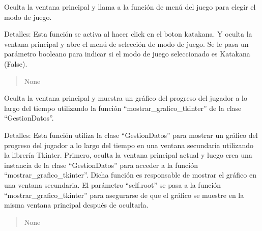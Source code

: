 \documentclass[letterpaper,10pt,spanish]{sphinxmanual}
\begin{document}
\begin{fulllineitems}
\begin{fulllineitems}
\begin{quote}
\begin{description}
\end{description}\end{quote}

\end{fulllineitems}


\begin{fulllineitems}
\label{\detokenize{main:main.MenuPrincipal.decision_katakana}}
\pysigstartsignatures
{}
\pysigstopsignatures
\sphinxAtStartPar
Oculta la ventana principal y llama a la función de menú del juego para elegir el modo de juego.

\sphinxAtStartPar
Detalles:
Esta función se activa al hacer click en el boton katakana. Y oculta la ventana principal y abre el
menú de selección de modo de juego. Se le pasa un parámetro booleano para indicar si el modo de juego
seleccionado es Katakana (False).
\begin{quote}\begin{description}
\sphinxAtStartPar
None

\end{description}\end{quote}

\end{fulllineitems}


\begin{fulllineitems}
\label{\detokenize{main:main.MenuPrincipal.mostrar_registro}}
\pysigstartsignatures
{}
\pysigstopsignatures
\sphinxAtStartPar
Oculta la ventana principal y muestra un gráfico del progreso del jugador a lo largo del tiempo
utilizando la función “mostrar\_grafico\_tkinter” de la clase “GestionDatos”.

\sphinxAtStartPar
Detalles:
Esta función utiliza la clase “GestionDatos” para mostrar un gráfico del progreso del jugador a lo
largo del tiempo en una ventana secundaria utilizando la librería Tkinter. Primero, oculta la ventana
principal actual y luego crea una instancia de la clase “GestionDatos” para acceder a la función
“mostrar\_grafico\_tkinter”. Dicha función es responsable de mostrar el gráfico en una ventana secundaria. El
parámetro “self.root” se pasa a la función “mostrar\_grafico\_tkinter” para asegurarse de que el gráfico se
muestre en la misma ventana principal después de ocultarla.
\begin{quote}\begin{description}
\sphinxAtStartPar
None


\end{description}
\end{quote}
\end{fulllineitems}
\end{fulllineitems}
\end{document}
